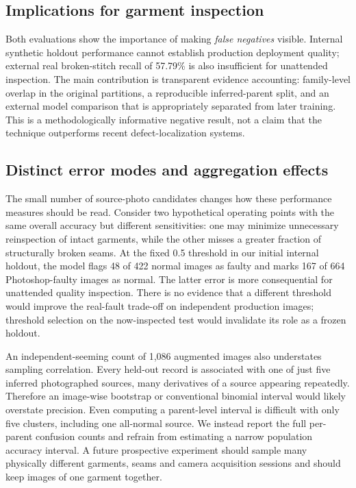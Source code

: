 \documentclass[conference,a4paper]{IEEEtran}
\begin{document}
\subsection{Implications for garment inspection}
Both evaluations show the importance of making \emph{false negatives} visible. Internal synthetic holdout performance cannot establish production deployment quality; external real broken-stitch recall of 57.79\% is also insufficient for unattended inspection. The main contribution is transparent evidence accounting: family-level overlap in the original partitions, a reproducible inferred-parent split, and an external model comparison that is appropriately separated from later training. This is a methodologically informative negative result, not a claim that the technique outperforms recent defect-localization systems.


\subsection{Distinct error modes and aggregation effects}
The small number of source-photo candidates changes how these performance measures should be read. Consider two hypothetical operating points with the same overall accuracy but different sensitivities: one may minimize unnecessary reinspection of intact garments, while the other misses a greater fraction of structurally broken seams. At the fixed 0.5 threshold in our initial internal holdout, the model flags 48 of 422 normal images as faulty and marks 167 of 664 Photoshop-faulty images as normal. The latter error is more consequential for unattended quality inspection. There is no evidence that a different threshold would improve the real-fault trade-off on independent production images; threshold selection on the now-inspected test would invalidate its role as a frozen holdout.

An independent-seeming count of 1,086 augmented images also understates sampling correlation. Every held-out record is associated with one of just five inferred photographed sources, many derivatives of a source appearing repeatedly. Therefore an image-wise bootstrap or conventional binomial interval would likely overstate precision. Even computing a parent-level interval is difficult with only five clusters, including one all-normal source. We instead report the full per-parent confusion counts and refrain from estimating a narrow population accuracy interval. A future prospective experiment should sample many physically different garments, seams and camera acquisition sessions and should keep images of one garment together.
\end{document}
